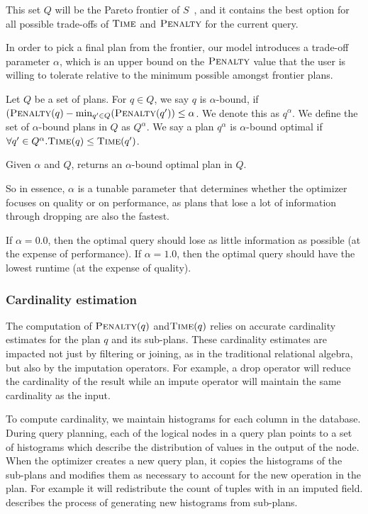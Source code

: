 This set $Q$ will be the Pareto frontier of $S$~\cite{pareto1964cours}, and it contains the best option for all possible trade-offs of $\textsc{Time}$ and $\textsc{Penalty}$ for the current query.

In order to pick a final plan from the frontier, our model introduces a trade-off parameter $\alpha$, which is an upper bound on the $\textsc{Penalty}$ value that the user is willing
to tolerate relative to the minimum possible amongst frontier plans.

\begin{definition}
Let $Q$ be a set of plans. For $q \in Q$, we say $q$ is $\alpha$-bound, if $(\textsc{Penalty}(q) - \min_{q' \in Q}(\textsc{Penalty}(q')) \leq \alpha$. We denote this as $q^\alpha$.
We define the set of $\alpha$-bound plans in $Q$ as $Q^\alpha$.
We say a plan $q^\alpha$ is $\alpha$-bound optimal if $\forall q' \in Q^\alpha. \textsc{Time}(q) \leq \textsc{Time}(q')$. 
\end{definition}

Given $\alpha$ and $Q$, \ProjectName{} returns an $\alpha$-bound optimal plan in $Q$.

So in essence, $\alpha$ is a tunable parameter that determines whether the optimizer focuses on quality or on performance, as plans that
lose a lot of information through dropping are also the fastest. 

If $\alpha=0.0$, then the optimal query should lose as little information as possible (at
the expense of performance). If $\alpha = 1.0$, then the optimal query should have the
lowest runtime (at the expense of quality).

\subsubsection{Cardinality estimation}
\label{sec:cardinal}
The computation of $\textsc{Penalty}(q)$ and$\textsc{Time}(q)$ relies on accurate cardinality estimates for the plan $q$ and its sub-plans.
These cardinality estimates are impacted not just by filtering or joining, as in the traditional relational algebra, but also by the imputation operators.
For example, a drop operator will reduce the cardinality of the result while an impute operator will maintain the same cardinality as the input.

To compute cardinality, we maintain histograms for each column in the database.
During query planning, each of the logical nodes in a query plan points to a set of histograms which describe the distribution of values in the output of the node.
When the optimizer creates a new query plan, it copies the histograms of the sub-plans and modifies them as necessary to account for the new operation in the plan.
For example it will redistribute the count of tuples with \nullv{} in an imputed field.
 describes the process of generating new histograms from sub-plans.

